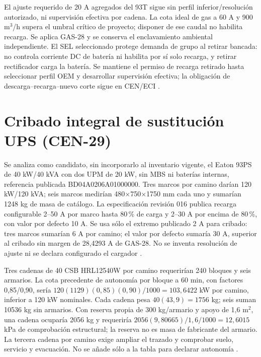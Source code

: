 El ajuste requerido de 20 A agregados del 93T sigue sin perfil inferior/resolución autorizado, ni supervisión efectiva por cadena. La cota ideal de gas a 60 A y 900 m$^3$/h supera el umbral crítico de proyecto; disponer de ese caudal no habilita recarga. Se aplica GAS-28 y se conserva el enclavamiento ambiental independiente. El SEL seleccionado protege demanda de grupo al retirar bancada: no controla corriente DC de batería ni habilita por sí solo recarga, y retirar rectificador carga la batería. Se mantiene el permiso de recarga retirado hasta seleccionar perfil OEM y desarrollar supervisión efectiva; la obligación de descarga--recarga--nuevo corte sigue en CEN/ECI \parencite[p.~98]{p7-eaton-93t-guia}.

\section{Cribado integral de sustitución UPS (CEN-29)}
\label{sec:sd4-cribado-cen29}

Se analiza como candidato, sin incorporarlo al inventario vigente, el Eaton 93PS de 40 kW/40 kVA con dos UPM de 20 kW, sin MBS ni baterías internas, referencia publicada BD04A0206A01000000. Tres marcos por camino darían 120 kW/120 kVA; seis marcos medirían 480$\times$750$\times$1750 mm cada uno y sumarían 1248 kg de masa de catálogo. La especificación revisión 016 publica recarga configurable 2--50 A por marco hasta 80\,\% de carga y 2--30 A por encima de 80\,\%, con valor por defecto 10 A. Se usa sólo el extremo publicado 2 A para cribado: tres marcos sumarían 6 A por camino; el valor por defecto sumaría 30 A, superior al cribado sin margen de 28,4293 A de GAS-28. No se inventa resolución de ajuste ni se declara configurado el cargador \parencites[pp.~2 y 5]{lote29-93psspec}{lote29-93pssku}.

Tres cadenas de 40 CSB HRL12540W por camino requerirían 240 bloques y seis armarios. La cota precedente de autonomía por bloque a 60 min, con factores 0,85/0,90, sería $120(1129)(0,85)(0,90)/1000=103,6422$ kW por camino, inferior a 120 kW nominales. Cada cadena pesa $40(43,9)=1756$ kg; seis suman 10536 kg sin armarios. Con reserva propia de 300 kg/armario y apoyo de 1,6 m$^2$, una cadena ocuparía 2056 kg y requeriría $2056(9,80665)/1,6/1000=12,6015$ kPa de comprobación estructural; la reserva no es masa de fabricante del armario. La tercera cadena por camino exige ampliar el trazado y comprobar suelo, servicio y evacuación. No se añade sólo a la tabla para declarar autonomía \parencite{csbHRL12540WRA260131}.

